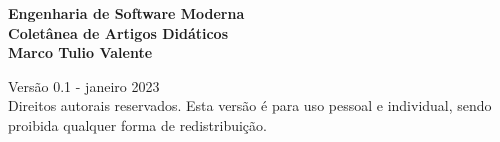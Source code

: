 \thispagestyle{empty}

\newpage
\thispagestyle{empty}
\vspace*{3.5cm}
\begin{center}
{\LARGE \bf Engenharia de Software Moderna}\\ 
\vspace*{0.8cm}
{\Huge \bf Coletânea de Artigos Didáticos}\\ 
\vspace*{3cm}
{\Large \bf Marco Tulio Valente}
\end{center}
\newpage

\thispagestyle{empty}
\vspace*{3cm}
\begin{center}
{\Large  Versão 0.1 - janeiro 2023}\\ 
\vspace*{1cm}
{Direitos autorais reservados. Esta versão é para uso pessoal e individual, sendo proibida qualquer forma de redistribuição.}
\end{center}
\newpage

\tableofcontents
